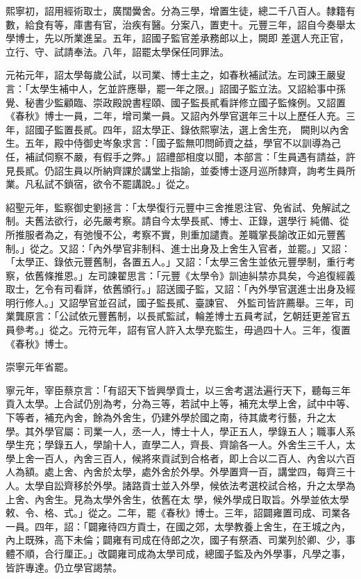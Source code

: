 \begin{pinyinscope}
 熙寧初，詔用經術取士，廣闊黌舍。分為三學，增置生徒，總二千八百人。隸籍有數，給食有等，庫書有官，治疾有醫。分案八，置吏十。元豐三年，詔自今奏舉太學博士，先以所業進呈。五年，詔國子監官差承務郎以上，闕即
 差選人充正官，立行、守、試請奉法。八年，詔罷太學保任同罪法。



 元祐元年，詔太學每歲公試，以司業、博士主之，如春秋補試法。左司諫王嚴叟言：「太學生補中人，乞並許應舉，罷一年之限。」詔國子監立法。又詔給事中孫覺、秘書少監顧臨、崇政殿說書程頤、國子監長貳看詳修立國子監條例。又詔置《春秋》博士一員，二年，增司業一員。又詔內外學官選年三十以上歷任人充。三年，詔國子監置長貳。四年，詔太學正、錄依熙寧法，選上舍生充，
 闕則以內舍生。五年，殿中侍御史岑象求言：「國子監無叩問師資之益，學官不以訓導為己任，補試伺察不嚴，有假手之弊。」詔禮部相度以聞，本部言：「生員遇有請益，許見長貳。仍詔生員以所納齊課於講堂上指諭，並委博士逐月巡所隸齊，詢考生員所業。凡私試不鎖宿，欲令不罷講說。」從之。



 紹聖元年，監察御史劉拯言：「太學復行元豐中三舍推恩注官、免省試、免解試之制。夫舊法欲行，必先嚴考察。請自今太學長貳、博士、正錄，選學行
 純備、從所推服者為之，有弛慢不公，考察不實，則重加譴責。差職掌長諭改正如元豐舊制。」從之。又詔：「內外學官非制科、進士出身及上舍生入官者，並罷。」又詔：「太學正、錄依元豐舊制，各置五人。」又詔：「太學三舍生並依元豐學制，重行考察，依舊條推恩。」左司諫翟思言：「元豐《太學令》訓迪糾禁亦具矣，今追復經義取士，乞令有司看詳，依舊頒行。」詔送國子監，又詔：「內外學官選進士出身及經明行修人。」又詔學官並召試，國子監長貳、臺諫官、
 外監司皆許薦舉。三年，司業龔原言：「公試依元豐舊制，以長貳監試，輪差博士五員考試，乞朝廷更差官五員參考。」從之。元符元年，詔有官人許入太學充監生，毋過四十人。三年，復置《春秋》博士。



 崇寧元年省罷。



 寧元年，宰臣蔡京言：「有詔天下皆興學貢士，以三舍考選法遍行天下，聽每三年貢入太學。上合試仍別為考，分為三等，若試中上等，補充太學上舍，試中中等、下等者，補充內舍，餘為外舍生，仍建外學於國之南，待其歲考行藝，升之太
 學。其外學官屬：司業一人，丞一人，博士十人，學正五人，學錄五人；職事人系學生充；學錄五人，學諭十人，直學二人，齊長、齊諭各一人。外舍生三千人，太學上舍一百人，內舍三百人，候將來貢試到合格者，即上合以二百人、內舍以六百人為額。處上舍、內舍於太學，處外舍於外學。外學置齊一百，講堂四，每齊三十人。太學自訟齊移於外學。諸路貢士並入外學，候依法考選校試合格，升之太學為上舍、內舍生。見為太學外舍生，依舊在太
 學，候外學成日取旨。外學並依太學敕、令、格、式。」從之。二年，罷《春秋》博士。三年，詔闢雍置司成、司業各一員。四年，詔：「闢雍待四方貢士，在國之郊，太學教養上舍生，在王城之內，內上既殊，高下未倫；闢雍有司成在侍郎之次，國子有祭酒、司業列於卿、少，事體不順，合行厘正。」改闢雍司成為太學司成，總國子監及內外學事，凡學之事，皆許專達。仍立學官謁禁。




\end{pinyinscope}
